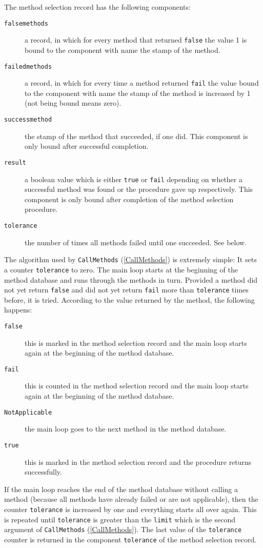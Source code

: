 \documentclass[a4paper,11pt]{report}
\begin{document}
{{ The method selection record has the following components: 
\begin{description}
\item[{\texttt{falsemethods}}] a record, in which for every method that returned \texttt{false} the value 1 is bound to the component with name the stamp of the method.
\item[{\texttt{failedmethods}}] a record, in which for every time a method returned \texttt{fail} the value bound to the component with name the stamp of the method is
increased by 1 (not being bound means zero).
\item[{\texttt{successmethod}}] the stamp of the method that succeeded, if one did. This component is only
bound after successful completion.
\item[{\texttt{result}}] a boolean value which is either \texttt{true} or \texttt{fail} depending on whether a successful method was found or the procedure gave up
respectively. This component is only bound after completion of the method
selection procedure.
\item[{\texttt{tolerance}}] the number of times all methods failed until one succeeded. See below.
\end{description}
 The algorithm used by \texttt{CallMethods} (\ref{CallMethods}) is extremely simple: It sets a counter \texttt{tolerance} to zero. The main loop starts at the beginning of the method database and runs
through the methods in turn. Provided a method did not yet return \texttt{false} and did not yet return \texttt{fail} more than \texttt{tolerance} times before, it is tried. According to the value returned by the method, the
following happens: 
\begin{description}
\item[{\texttt{false}}] this is marked in the method selection record and the main loop starts again
at the beginning of the method database.
\item[{\texttt{fail}}] this is counted in the method selection record and the main loop starts again
at the beginning of the method database.
\item[{\texttt{NotApplicable}}] the main loop goes to the next method in the method database.
\item[{\texttt{true}}] this is marked in the method selection record and the procedure returns
successfully.
\end{description}
 If the main loop reaches the end of the method database without calling a
method (because all methods have already failed or are not applicable), then
the counter \texttt{tolerance} is increased by one and everything starts all over again. This is repeated
until \texttt{tolerance} is greater than the \texttt{limit} which is the second argument of \texttt{CallMethods} (\ref{CallMethods}). The last value of the \texttt{tolerance} counter is returned in the component \texttt{tolerance} of the method selection record.

}}
\end{document}
